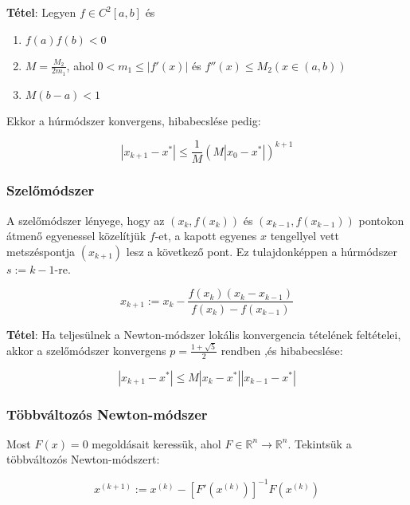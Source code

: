\documentclass[margin=0px]{article}
\begin{document}
	\noindent \textbf{Tétel}: Legyen $f \in C^{2}[a,b]$ és
	\begin{enumerate}
		\item	$f(a)f(b)<0$
		\item	$M = \frac{M_{2}}{2m_{1}}$, ahol $0<m_{1} \leq |f'(x)|$ és $f''(x) \leq M_{2} (x \in (a,b))$
		\item	$M(b-a) < 1$
	\end{enumerate}
	
	\noindent Ekkor a húrmódszer konvergens, hibabecslése pedig:
	
	\begin{displaymath}
		|x_{k+1} - x^{*}| \leq \frac{1}{M}(M|x_{0}-x^{*}|)^{k+1}
	\end{displaymath}
	
	\subsubsection{Szelőmódszer}
	A szelőmódszer lényege, hogy az $(x_{k},f(x_{k}))$ és $(x_{k-1},f(x_{k-1}))$ pontokon átmenő egyenessel közelítjük
	$f$-et, a kapott egyenes $x$ tengellyel vett metszéspontja $(x_{k+1})$ lesz a következő pont. Ez
	tulajdonképpen a húrmódszer $s := k - 1$-re.
	
	\begin{displaymath}
		x_{k+1} :=
		x_{k} -
		\frac
		{f(x_{k}) (x_{k} -x_{k-1}) }
		{f(x_{k}) - f(x_{k-1})}		
	\end{displaymath}
	
	\noindent \textbf{Tétel}: Ha teljesülnek a Newton-módszer lokális konvergencia tételének feltételei, akkor a szelőmódszer
	konvergens $p = \frac{1+\sqrt{5}}{2}$ rendben ,és hibabecslése:
	
	\begin{displaymath}
		|x_{k+1} - x^{*}| \leq M|x_{k}-x^{*}||x_{k-1}-x^{*}|
	\end{displaymath}
	
	\subsubsection{Többváltozós Newton-módszer}
	
	Most $F(x) = 0$ megoldásait keressük, ahol $F \in \mathbb{R}^{n} \to \mathbb{R}^{n}$. Tekintsük a többváltozós Newton-módszert:
	
	\begin{displaymath}
		x^{(k+1)} := x^{(k)} - [F'(x^{(k)})]^{-1}F(x^{(k)})
	\end{displaymath}
	
\end{document}
